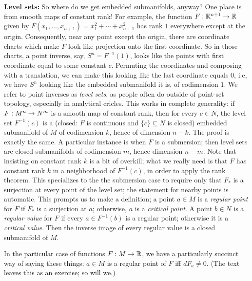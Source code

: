 \msk

{\bf Level sets:} So where do we get embedded submanifolds, anyway? One place is from smooth 
maps of constant rank! For example, the function $F:{\Bbb R}^{n+1}\rightarrow {\Bbb R}$ given by 
$F(x_1,\ldots ,x_{n+1})=x_1^2+\cdots +x_{n+1}^2$ has rank $1$ everywhere except at the origin.
Consequently, near any point except the origin, there are coordinate charts which make $F$ 
look like projection onto the first coordinate. So in those charts, a point inverse,
say, $S^n=F^{-1}(1)$, looks like the points with first coordinate equal to some constant $c$.
Permuting the coordinates and composing with a translation, we can make this looking
like the last coordinate equals $0$, i.e, we have $S^n$ looking like the embedded submanifold
it is, of codimension $1$. We refer to point inverses as {\it level sets}, as people often do 
outside of point-set topology, especially in analytical cricles.
This works in complete generality: if $F:M^n\rightarrow N^m$ is a smooth map of constant rank,
then for every $c\in N$, the level set $F^{-1}(c)$ is a 
(closed: $F$ is continuous and $\{c\}\subseteq N$ is closed)
embedded submanifold of $M$ of codimension $k$, hence of dimension $n-k$. The proof is
exactly the same. A particular instance is when $F$ is a submersion;
then level sets are closed submanifolds of codimension $m$, hence dimension $n-m$.
Note that insisting on constant rank $k$ is a bit of overkill; what we really
need is that $F$ has constant rank $k$ in a neighborhood of $F^{-1}(c)$, in order to apply
the rank theorem. This specializes to the the submersion case to require only that
$F_*$ is a surjection at every point of the level set; the statement for nearby points is
automatic. This prompts us to make a definition; a point $a\in M$ is a {\it regular point}
for $F$ if $F_*$ is a surjection at $a$; otherwise,
$a$ is a {\it critical point}. A point $b\in N$ is a {\it regular value}
for $F$ if every $a\in F^{-1}(b)$ is a regular point; otherwise it is a {\it critical value}.
Then the inverse image of every regular value is a closed submanifold of $M$.

\ssk

In the particular case of functions $F:M\rightarrow {\Bbb R}$, we have a particularly succinct way of saying these things; 
$a\in M$ is a regular point of $F$ iff $dF_a\neq 0$. (The text leaves this as an exercise; so will we.)

\msk

